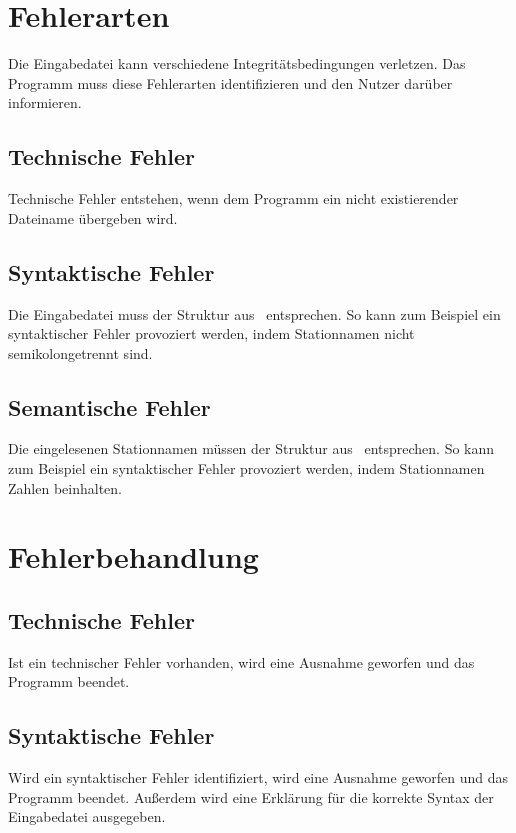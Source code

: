 \section{Fehlerarten}\label{sec:fehlerarten}
Die Eingabedatei kann verschiedene Integritätsbedingungen verletzen.
Das Programm muss diese Fehlerarten identifizieren und den Nutzer darüber informieren.

\subsection{Technische Fehler}\label{subsec:technische-fehler}
Technische Fehler entstehen, wenn dem Programm ein nicht existierender Dateiname übergeben wird.

\subsection{Syntaktische Fehler}\label{subsec:syntaktische-fehler}
Die Eingabedatei muss der Struktur aus~ entsprechen.
So kann zum Beispiel ein syntaktischer Fehler provoziert werden, indem Stationnamen nicht semikolongetrennt sind.

\subsection{Semantische Fehler}\label{subsec:semantische-fehler}
Die eingelesenen Stationnamen müssen der Struktur aus~ entsprechen.
So kann zum Beispiel ein syntaktischer Fehler provoziert werden, indem Stationnamen Zahlen beinhalten.

\section{Fehlerbehandlung}\label{sec:fehlerbehandlung}

\subsection{Technische Fehler}\label{subsec:technische-fehler-behandlung}
Ist ein technischer Fehler vorhanden, wird eine Ausnahme geworfen und das Programm beendet.


\subsection{Syntaktische Fehler}\label{subsec:syntaktische-fehler-behandlung}
Wird ein syntaktischer Fehler identifiziert, wird eine Ausnahme geworfen und das Programm beendet. Außerdem wird eine Erklärung für die korrekte Syntax der Eingabedatei ausgegeben.

